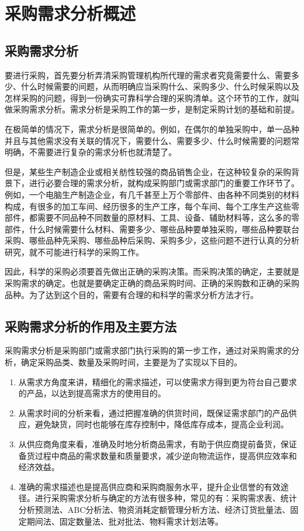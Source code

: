 \section {采购需求分析概述}

    \subsection {采购需求分析}
    要进行采购，首先要分析弄清采购管理机构所代理的需求者究竟需要什么、需要多少、什么时候需要的间题，从而明确应当采购什么、采购多少、什么时候采购以及怎样采购的问题，得到一份确实可靠科学合理的采购清单。这个环节的工作，就叫做采购需求分析。需求分析是采购工作的第一步，是制定采购计划的基础和前提。

    在极简单的情况下，需求分析是很简单的。例如，在偶尔的单独采购中，单一品种并且与其他需求没有关联的情况下，需要什么、需要多少、什么时候需要的问题常明确，不需要进行复杂的需求分析也就清楚了。

    但是，某些生产制造企业或相关舫性较强的商品销售企业，在这种较复杂的采购背景下，进行必要合理的需求分析，就构成采购部门或需求部门的重要工作环节了。例如，一个电脑生产制造企业，有几千甚至上万个零部件、由各种不同类别的材料构成，有很多的加工车间、经历很多的生产工序，每个车间、每个工序生产这些零部件，都需要不同品种不同数量的原材料、工具、设备、辅助材料等，这么多的零部件，什么时候需要什么材料、需要多少、哪些品种要单独采购，哪些品种要联台采购、哪些品种先采购、哪些品种后采购、采购多少，这些问题不迸行认真的分析研究，就不可能进行科学的采购工作。

    因此，科学的采购必须要首先做出正确的采购决策。而采购决策的确定，主要就是采购需求的确定。也就是要确定正确的商品采购时间、正确的采购数和正确的采购品种。为了达到这个目的，需要有合理的和科学的需求分析方法才行。

    \subsection {采购需求分析的作用及主要方法}

    采购需求分析是采购部门或需求部门执行采购的第一步工作，通过对采购需求的分析，确定采购品类、数量及采购时间，主要是为了实现以下目的。

    \begin{enumerate}
        \item 从需求方角度来讲，精细化的需求描述，可以使需求方得到更为符台自己要求的产品，以达到提高需求方的使用目的。

        \item 从需求时间的分析来看，通过把握准确的供货时间，既保证需求部门的产品供应，避免缺货，同时也能够在库存控制中，降低库存成本，提高企业利润。

        \item 从供应商角度来看，准确及时地分析商品需求，有助于供应商提前备货，保证备货过程中商品的需求数量和质量要求，减少逆向物流运作，提高供应效率和经济效益。

        \item 准确的需求描述也是提高供应商和采购商服务水平，提升企业信誉的有效途径。进行采购需求分析与确定的方法有很多种，常见的有：采购需求表、统计分析预测法、ABC分析法、物资消耗定额管理分析方法、经济订货批量法、固定期间法、固定数量法、批对批法、物料需求计划法等。
    \end{enumerate}

